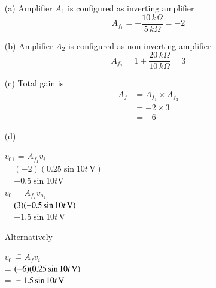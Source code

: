 \begin{solution}
\begin{itemize}
\item[(a)] Amplifier $A_{1}$ is configured as inverting amplifier
$$
A_{f_{1}}=-\dfrac{10\, k\Omega}{5\, k\Omega}=-2
$$

\item[(b)] Amplifier $A_{2}$ is configured as non-inverting amplifier
$$
A_{f_{2}}=1+\dfrac{20\, k\Omega}{10\, k\Omega}=3
$$

\item[(c)] Total gain is
\begin{align*}
A_{f} &= A_{f_{1}} \times A_{f_{2}}\\[4pt]
&= -2\times 3\\[4pt]
& =-6
\end{align*}

\item[(d)]
\begin{tabbing}
$v_{01}$  \= = $A_{f_{1}}v_{i}$\\[9pt]
         \> = $(-2)(0.25\sin 10t\,\text{V})$\\[9pt]
         \> = $-0.5\sin 10t\text{V}$\\[9pt]
$v_{0}$  \> = $A_{f_{2}}v_{o_1}$\\[9pt]
         \> = $(3)(-0.5\sin 10t\operatorname{\mathrm{V}})$\\[9pt]
         \> = $-1.5 \sin 10t\,\text{V}$
\end{tabbing}

\smallskip
Alternatively\\[-23pt]
\begin{tabbing}
$v_{0}$ \== $A_{f}v_{i}$\\[9pt]
        \>= $(-6)(0.25\sin 10 t\operatorname{\mathrm{V}})$\\[9pt]
        \>= ${}-1.5\sin 10t\operatorname{\mathrm{V}}$
\end{tabbing}
\end{itemize}
\vskip -1cm
\end{solution}

\bigskip

